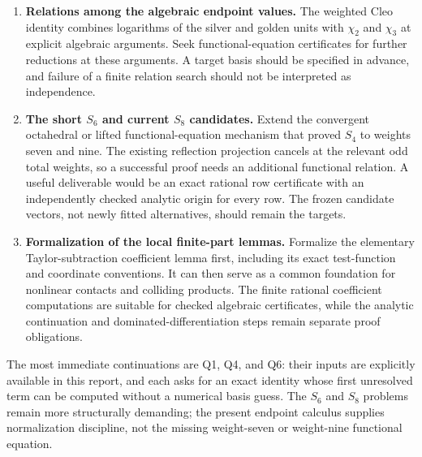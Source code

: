 \documentclass[11pt,a4paper]{article}
\numberwithin{equation}{section}
\theoremstyle{definition}
\theoremstyle{remark}
\begin{document}
\begin{enumerate}[label=\textbf{Q\arabic*.},leftmargin=*]
\item \textbf{Relations among the algebraic endpoint values.}
The weighted Cleo identity combines logarithms of the silver and golden
units with $\chi_2$ and $\chi_3$ at explicit algebraic arguments. Seek
functional-equation certificates for further reductions at these
arguments. A target basis should be specified in advance, and failure
of a finite relation search should not be interpreted as independence.

\item \textbf{The short $S_6$ and current $S_8$ candidates.}
Extend the convergent octahedral or lifted functional-equation mechanism
that proved $S_4$ to weights seven and nine. The existing reflection
projection cancels at the relevant odd total weights, so a successful
proof needs an additional functional relation. A useful deliverable
would be an exact rational row certificate with an independently
checked analytic origin for every row. The frozen candidate vectors,
not newly fitted alternatives, should remain the targets.

\item \textbf{Formalization of the local finite-part lemmas.}
Formalize the elementary Taylor-subtraction coefficient lemma first,
including its exact test-function and coordinate conventions. It can
then serve as a common foundation for nonlinear contacts and colliding
products. The finite rational coefficient computations are suitable
for checked algebraic certificates, while the analytic continuation
and dominated-differentiation steps remain separate proof obligations.
\end{enumerate}

The most immediate continuations are Q1, Q4, and Q6: their inputs are
explicitly available in this report, and each asks for an exact identity
whose first unresolved term can be computed without a numerical basis
guess. The $S_6$ and $S_8$ problems remain more structurally demanding;
the present endpoint calculus supplies normalization discipline, not
the missing weight-seven or weight-nine functional equation.


\clearpage
\end{document}
